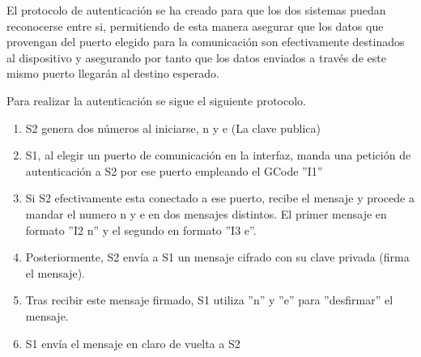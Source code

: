 El protocolo de autenticación se ha creado para que los dos sistemas puedan reconocerse entre si, permitiendo de esta manera asegurar que los datos que provengan del puerto elegido para la comunicación son efectivamente destinados al dispositivo y asegurando por tanto que los datos enviados a través de este mismo puerto llegarán al destino esperado.

Para realizar la autenticación se sigue el siguiente protocolo.

\begin{enumerate}
  \item \ac{S2} genera dos números al iniciarse, n y e (La clave publica)
  \item \ac{S1}, al elegir un puerto de comunicación en la interfaz, manda una petición de autenticación a \ac{S2} por ese puerto empleando el GCode ''I1''
  \item Si \ac{S2} efectivamente esta conectado a ese puerto, recibe el mensaje y procede a mandar el numero n y e en dos mensajes distintos. El primer mensaje en formato ''I2 n'' y el segundo en formato ''I3 e''.
  \item Posteriormente, \ac{S2} envía a \ac{S1} un mensaje cifrado con su clave privada (firma el mensaje).
  \item Tras recibir este mensaje firmado, \ac{S1} utiliza ''n'' y ''e'' para ''desfirmar'' el mensaje.
  \item \ac{S1} envía el mensaje en claro de vuelta a \ac{S2} 
\end{enumerate}
